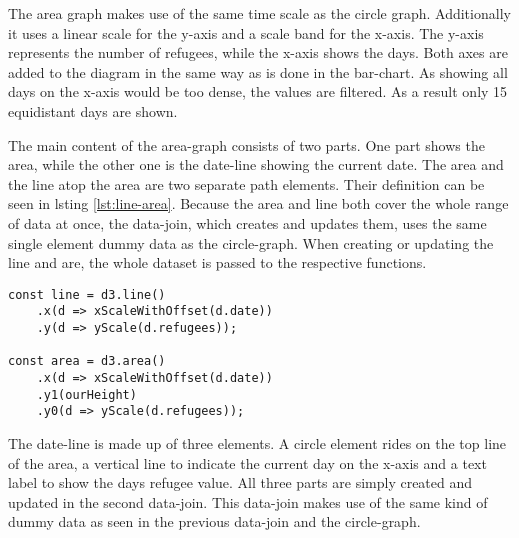 The area graph makes use of the same time scale as the circle graph. Additionally it uses a linear scale for the y-axis and a scale band for the x-axis. The y-axis represents the number of refugees, while the x-axis shows the days. Both axes are added to the diagram in the same way as is done in the bar-chart. As showing all days on the x-axis would be too dense, the values are filtered. As a result only 15 equidistant days are shown.

The main content of the area-graph consists of two parts. One part shows the area, while the other one is the date-line showing the current date. The area and the line atop the area are two separate path elements. Their definition can be seen in lsting \ref{lst:line-area}. Because the area and line both cover the whole range of data at once, the data-join, which creates and updates them, uses the same single element dummy data as the circle-graph. When creating or updating the line and are, the whole dataset is passed to the respective functions.

\begin{minipage}{0.9\linewidth}
    \begin{lstlisting}[style=htmlcssjs, captionpos=b, caption={The first constant defines the function for creating the top-line of the area graph. Therefore the functions for x and y values are defined. When the function is called and a data-set is provided, by calling \texttt{line(data)}, the line is constructed by calculating the according x and y positions for every data-point. Defining and creating the area works in similar fashion. Yet there are two y-positions for each x-position. This allows for a huge variety of shapes. Yet it is not possible to create concave ends on the right or left side of the diagram, assuming left and rigth are aligned with the orientation of the x-axis.}, label={lst:line-area}]
const line = d3.line()
    .x(d => xScaleWithOffset(d.date))
    .y(d => yScale(d.refugees));

const area = d3.area()
    .x(d => xScaleWithOffset(d.date))
    .y1(ourHeight)
    .y0(d => yScale(d.refugees));
    \end{lstlisting}
\end{minipage}

The date-line is made up of three elements. A circle element rides on the top line of the area, a vertical line to indicate the current day on the x-axis and a text label to show the days refugee value. All three parts are simply created and updated in the second data-join. This data-join makes use of the same kind of dummy data as seen in the previous data-join and the circle-graph.


